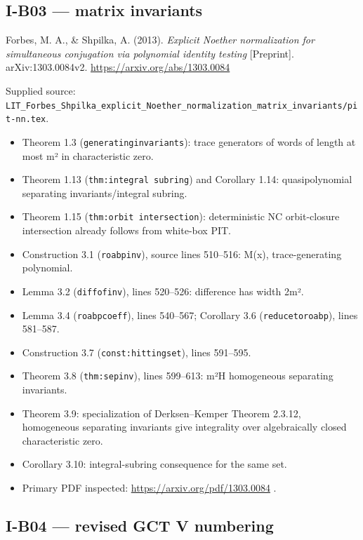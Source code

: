 \documentclass[11pt,a4paper]{article}
\providecommand{\tightlist}{\setlength{\itemsep}{0pt}\setlength{\parskip}{0pt}}
\theoremstyle{definition}\newtheorem{definition}{Definition}
\begin{document}
\subsection{I-B03 --- matrix invariants}\label{i-b03--matrix-invariants}

Forbes, M. A., \& Shpilka, A. (2013). \emph{Explicit Noether
normalization for simultaneous conjugation via polynomial identity
testing} {[}Preprint{]}. arXiv:1303.0084v2.
\url{https://arxiv.org/abs/1303.0084}

Supplied source:
\nolinkurl{LIT_Forbes_Shpilka_explicit_Noether_normalization_matrix_invariants/pit-nn.tex}.

\begin{itemize}
\tightlist
\item
  Theorem 1.3 (\nolinkurl{generatinginvariants}): trace generators of words
  of length at most m² in characteristic zero.
\item
  Theorem 1.13 (\texttt{thm:integral\ subring}) and Corollary 1.14:
  quasipolynomial separating invariants/integral subring.
\item
  Theorem 1.15 (\texttt{thm:orbit\ intersection}): deterministic NC
  orbit-closure intersection already follows from white-box PIT.
\item
  Construction 3.1 (\nolinkurl{roabpinv}), source lines 510--516: M(x),
  trace-generating polynomial.
\item
  Lemma 3.2 (\nolinkurl{diffofinv}), lines 520--526: difference has width
  2m².
\item
  Lemma 3.4 (\nolinkurl{roabpcoeff}), lines 540--567; Corollary 3.6
  (\nolinkurl{reducetoroabp}), lines 581--587.
\item
  Construction 3.7 (\nolinkurl{const:hittingset}), lines 591--595.
\item
  Theorem 3.8 (\nolinkurl{thm:sepinv}), lines 599--613:
  m²\textbar H\textbar{} homogeneous separating invariants.
\item
  Theorem 3.9: specialization of Derksen--Kemper Theorem 2.3.12,
  homogeneous separating invariants give integrality over algebraically
  closed characteristic zero.
\item
  Corollary 3.10: integral-subring consequence for the same set.
\item
  Primary PDF inspected: \url{https://arxiv.org/pdf/1303.0084} .
\end{itemize}

\subsection{I-B04 --- revised GCT V
numbering}\label{i-b04--revised-gct-v-numbering}
\end{document}
